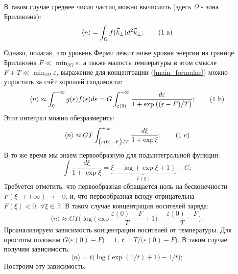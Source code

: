 \documentclass[a4paper, 14pt, russian]{article}
\newcommand{\pa}{\partial}
\newcommand{\vep}{\varepsilon}
\newcommand{\ptag}[1]{\tag{\arabic{equation} #1}}
\newcommand{\etag}[1]{\addtocounter{equation}{1}\tag{\arabic{equation} #1}}
\begin{document}
        В таком случае среднее число частиц можно вычислить (здесь $\Omega$ - зона Бриллюэна):
        \begin{equation}
            \label{main_formulae}
            \langle n \rangle = \int_\Omega f(\vec{k}_\perp) d^2 \vec{k}_\perp;
            \etag a
        \end{equation}

        Однако, полагая, что уровень Ферми лежит ниже уровня энергии на границе
        Бриллюэна $F \ll \min_{\pa \Omega} \vep$, а также малость температуры в этом смысле
        $F + T \ll \min_{\pa \Omega} \vep$, выражение для концентрации (\ref{main_formulae}) можно
        упростить за счёт хорошей сходимости:
        \begin{equation}
            \langle n \rangle \approx \int_0^{+\infty} g(\vep) f(\vep) d \vep = 
            G \int_{\vep(0)}^{+\infty} \frac{d \vep}{1 + \exp\big((\vep - F) / T \big)}; \ptag b
        \end{equation}
        Этот интеграл можно обезразмерить:
        \begin{equation}
            \langle n \rangle \approx GT \int_{\big(\vep(0)-F\big)/T}^{+\infty} 
            \frac{d\xi}{ 1 + \exp \xi}; \ptag c
        \end{equation}
        В то же время мы знаем первообразную для подынтегральной функции:
        \begin{equation}
            \int \frac{d\xi}{1 + \exp \xi} = \underbrace{\xi - \log(\exp \xi + 1)}_{F(\xi)} + C;
        \end{equation}
        Требуется отметить, что первообразная обращается ноль на бесконечности
        $F(\xi \rightarrow + \infty) \rightarrow -0$, и, что 
        первообразная всюду отрицательна $F(\xi) < 0,~\forall \xi \in \mathbb{R}$. 
        В таком случае концентрация носителей заряда:
        \begin{equation}
            \langle n \rangle \approx GT \bigg(\log\Big(
                \exp\frac{\vep(0) - F}{T} + 1\Big) - \frac{\vep(0) - F}{T}\bigg); \tag{5 c}
        \end{equation}
        Проанализируем зависимость концентрации носителей от температуры. 
        Для простоты положим $G\big(\vep(0) - F\big) = 1,~t = T / \big(\vep(0) - F\big)$.
        В таком случае получим зависимость:
        \begin{equation}
            \langle n \rangle = t \Big(\log\big(\exp(1 / t) + 1\big) - 1 / t\Big);
        \end{equation}
        Построим эту зависимость:
\end{document}
